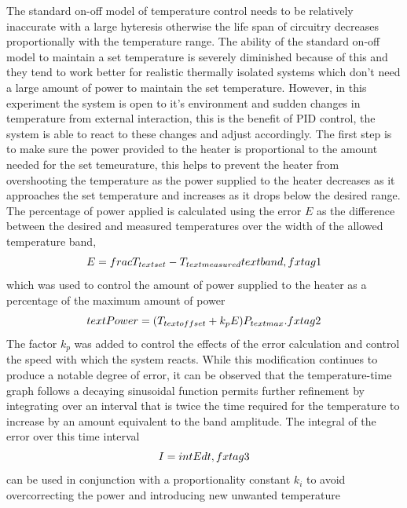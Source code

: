 \documentclass[11pt]{article}
\begin{document}
    The standard on-off model of temperature control needs to be relatively
inaccurate with a large hyteresis otherwise the life span of circuitry
decreases proportionally with the temperature range. The ability of the
standard on-off model to maintain a set temperature is severely
diminished because of this and they tend to work better for realistic
thermally isolated systems which don't need a large amount of power to
maintain the set temperature. However, in this experiment the system is
open to it's environment and sudden changes in temperature from external
interaction, this is the benefit of PID control, the system is able to
react to these changes and adjust accordingly. The first step is to make
sure the power provided to the heater is proportional to the amount
needed for the set temeurature, this helps to prevent the heater from
overshooting the temperature as the power supplied to the heater
decreases as it approaches the set temperature and increases as it drops
below the desired range. The percentage of power applied is calculated
using the error \(E\) as the difference between the desired and measured
temperatures over the width of the allowed temperature band,
\[E = \\frac{T_{\\text{set}} - T_{\\text{measured}}}{\\text{band}}, \\tag{1}\]
which was used to control the amount of power supplied to the heater as
a percentage of the maximum amount of power
\[ \\text{Power} = ( T_{\\text{offset}} + k_p E ) P_{\\text{max}}. \\tag{2}\]
The factor \(k_p\) was added to control the effects of the error
calculation and control the speed with which the system reacts. While
this modification continues to produce a notable degree of error, it can
be observed that the temperature-time graph follows a decaying
sinusoidal function permits further refinement by integrating over an
interval that is twice the time required for the temperature to increase
by an amount equivalent to the band amplitude. The integral of the error
over this time interval \[I = \\int {E } dt\\, \\tag{3}\] can be used in
conjunction with a proportionality constant \(k_i\) to avoid
overcorrecting the power and introducing new unwanted temperature
\end{document}

